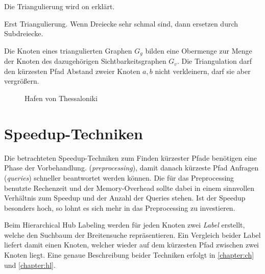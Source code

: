 Die Triangulierung wird on \cite{funkescalable} erklärt.


Erst Triangulierung. Wenn Dreiecke sehr schmal sind, dann ersetzen durch Subdreiecke.

Die Knoten eines triangulierten Graphen $G_g$ bilden eine Obermenge zur Menge der Knoten des dazugehörigen Sichtbarkeitsgraphen $G_v$.
Die Triangulation darf den kürzesten Pfad Abstand zweier Knoten $a, b$ nicht verkleinern, darf sie aber vergrößern.


\begin{figure}[ht]%
    \centering
    \caption{Hafen von Thessaloniki}%
    \label{fig:thessaloniki}%
\end{figure}

\section{Speedup-Techniken}

Die betrachteten Speedup-Techniken zum Finden kürzester Pfade benötigen eine Phase der Vorbehandlung. (\emph{preprocessing}), damit danach kürzeste Pfad Anfragen (\emph{queries}) schneller beantwortet werden können.
Die für das Preprocessing benutzte Rechenzeit und der Memory-Overhead sollte dabei in einem sinnvollen Verhältnis zum Speedup und der Anzahl der Queries stehen.
Ist der Speedup besonders hoch, so lohnt es sich mehr in das Preprocessing zu investieren.


Beim Hierarchical Hub Labeling werden für jeden Knoten zwei \emph{Label} erstellt, welche den Suchbaum der Breitensuche repräsentieren.
Ein Vergleich beider Label liefert damit einen Knoten, welcher wieder auf dem kürzesten Pfad zwischen zwei Knoten liegt.
Eine genaue Beschreibung beider Techniken erfolgt in \autoref{chapter:ch} und \autoref{chapter:hl}.





